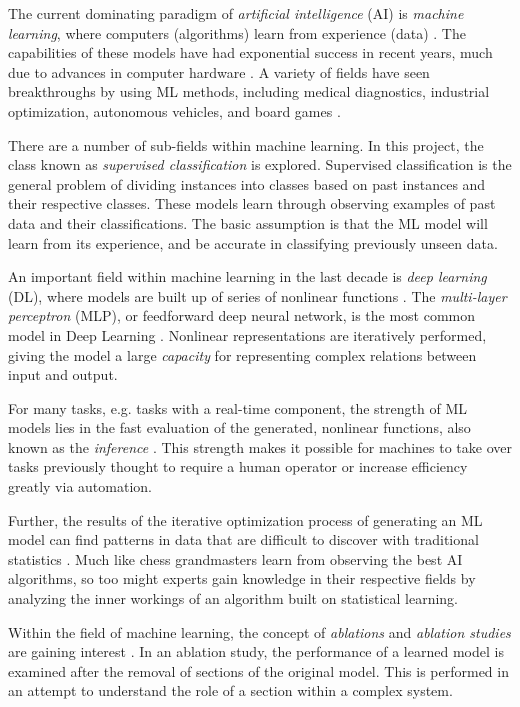 The current dominating paradigm of \textit{artificial intelligence} (\gls{AI}) is \textit{machine learning}, where computers (algorithms) learn from experience (data) \cite{goodfellow2016deep}. The capabilities of these models have had exponential success in recent years, much due to advances in computer hardware \cite{goodfellow2016deep}. A variety of fields have seen breakthroughs by using \gls{ML} methods, including medical diagnostics, industrial optimization, autonomous vehicles, and board games \cite{goodfellow2016deep}. 

There are a number of sub-fields within machine learning. In this project, the class known as \textit{supervised classification} is explored. Supervised classification is the general problem of dividing instances into classes based on past instances and their respective classes. These models learn through observing examples of past data and their classifications. The basic assumption is that the \gls{ML} model will learn from its experience, and be accurate in classifying previously unseen data. 

An important field within machine learning in the last decade is \textit{deep learning} (\gls{DL}), where models are built up of series of nonlinear functions \cite{goodfellow2016deep}. The \textit{multi-layer perceptron} (\gls{MLP}), or feedforward deep neural network, is the most common model in Deep Learning \cite{goodfellow2016deep}. Nonlinear representations are iteratively performed, giving the model a large \textit{capacity} for representing complex relations between input and output. 

For many tasks, e.g. tasks with a real-time component, the strength of \gls{ML} models lies in the fast evaluation of the generated, nonlinear functions, also known as the \textit{inference} \cite{bertsimas2019online}. This strength makes it possible for machines to take over tasks previously thought to require a human operator or increase efficiency greatly via automation.

Further, the results of the iterative optimization process of generating an \gls{ML} model can find patterns in data that are difficult to discover with traditional statistics \cite{goodfellow2016deep}. Much like chess grandmasters learn from observing the best \gls{AI} algorithms, so too might experts gain knowledge in their respective fields by analyzing the inner workings of an algorithm built on statistical learning.  

Within the field of machine learning, the concept of \textit{ablations} and \textit{ablation studies} are gaining interest \cite{meyes2019ablation}. In an ablation study, the performance of a learned model is examined after the removal of sections of the original model. This is performed in an attempt to understand the role of a section within a complex system.  


